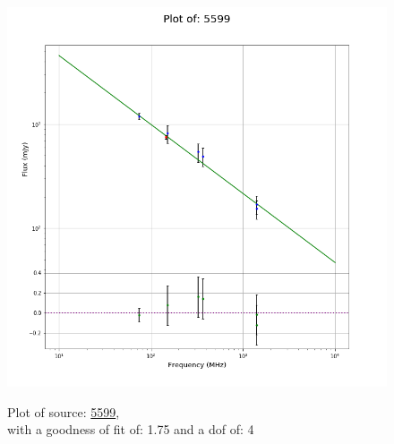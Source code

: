 \documentclass{article}
\begin{document}
\begin{figure}[H]
    \centering
    \begin{minipage}{.5\textwidth}
        \centering
        \includegraphics[scale = 0.35]{KmeulenSimSource_1hr/1hr5599.png}
        \captionsetup{labelformat=empty}
        \caption{Plot of source: \href{http://banana.transientskp.org/r4/vlo_KmeulenSimSource/runningcatalog/5599}{5599},\\with a goodness of fit of: 1.75 and a dof of: 4}
        \addtocounter{figure}{-1}
        \label{KmeulenSimSource:1hr:5599:plot}
    \end{minipage}%
    \begin{minipage}{0.5\textwidth}
        \centering


\end{minipage}
\end{figure}
\end{document}
